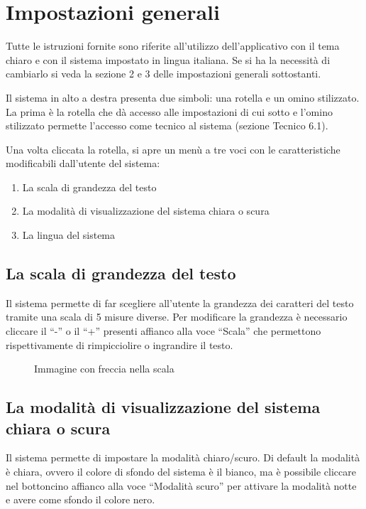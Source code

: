 \section{Impostazioni generali}

Tutte le istruzioni fornite sono riferite all'utilizzo dell'applicativo con il tema chiaro e con il sistema impostato in lingua italiana. Se si ha la necessità di cambiarlo si veda la sezione 2 e 3 delle impostazioni generali sottostanti.

Il sistema in alto a destra presenta due simboli: una rotella e un omino stilizzato. La prima è la rotella che dà accesso alle impostazioni di cui sotto e l'omino stilizzato permette l'accesso come tecnico al sistema (sezione Tecnico 6.1).

Una volta cliccata la rotella, si apre un menù a tre voci con le caratteristiche modificabili dall'utente del sistema:
\begin{enumerate}
    \item La scala di grandezza del testo
    \item La modalità di visualizzazione del sistema chiara o scura
    \item La lingua del sistema
\end{enumerate}

\subsection{La scala di grandezza del testo}

Il sistema permette di far scegliere all'utente la grandezza dei caratteri del testo tramite una scala di 5 misure diverse. Per modificare la grandezza è necessario cliccare il ``-'' o il ``+'' presenti affianco alla voce ``Scala'' che permettono rispettivamente di rimpicciolire o ingrandire il testo.

\begin{figure}[H]
    \centering
    \caption{Immagine con freccia nella scala}
  \end{figure}

\subsection{La modalità di visualizzazione del sistema chiara o scura}

Il sistema permette di impostare la modalità chiaro/scuro. Di default la modalità è chiara, ovvero il colore di sfondo del sistema è il bianco, ma è possibile cliccare nel bottoncino affianco alla voce ``Modalità scuro'' per attivare la modalità notte e avere come sfondo il colore nero.

